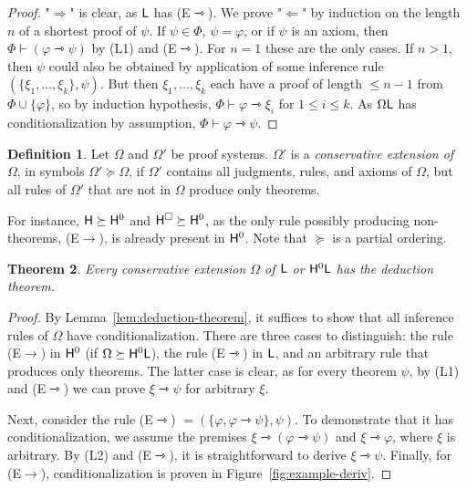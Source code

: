 \documentclass[a4paper,english,fleqn,11pt,final]{scrartcl}
\newcommand{\sfH}{\protect\ensuremath{\mathsf{H}}}
\newcommand{\sfL}{\protect\ensuremath{\mathsf{L}}}
\newcommand{\imp}{\rightarrow}
\newcommand{\timp}{\rightarrowtriangle}
\newcommand{\Deriv}[1]{{\normalfont\textsf{#1}}}
\theoremstyle{plain}
\newtheorem{theorem}{Theorem}[section]
\theoremstyle{definition}
\newtheorem{definition}[theorem]{Definition}
\begin{document}
\begin{proof}
"$\Rightarrow$" is clear, as $\sfL$ has \Deriv{(E$\timp$)}.
We prove "$\Leftarrow$" by induction on the length $n$ of a shortest proof of $\psi$.
If $\psi \in \Phi$, $\psi = \varphi$, or if $\psi$ is an axiom, then $\Phi \vdash (\varphi \timp \psi)$ by \Deriv{(L1)} and \Deriv{(E$\timp$)}.
For $n = 1$ these are the only cases.
If $n > 1$, then $\psi$ could also be obtained by application of some inference rule $(\{\xi_1, \ldots, \xi_k\},\psi)$.
But then $\xi_1, \ldots, \xi_k$ each have a proof of length $\leq n-1$ from $\Phi \cup \{\varphi\}$, so by induction hypothesis, $\Phi \vdash \varphi \timp \xi_i$ for $1 \leq i \leq k$.
As $\Omega\sfL$ has conditionalization by assumption, $\Phi \vdash \varphi \timp \psi$.
\end{proof}


\begin{definition}
Let $\Omega$ and $\Omega'$ be proof systems.
$\Omega'$ is a \emph{conservative extension of} $\Omega$, in symbols $\Omega' \succeq \Omega$, if $\Omega'$ contains all judgments, rules, and axioms of $\Omega$, but all rules of $\Omega'$ that are not in $\Omega$ produce only theorems.
\end{definition}

For instance, $\sfH \succeq \sfH^0$ and $\sfH^\Box \succeq \sfH^0$, as the only rule possibly producing non-theorems, \Deriv{(E$\imp$)}, is already present in $\sfH^0$.
Note that $\succeq$ is a partial ordering.



\begin{theorem}\label{thm:ext-deduction}
Every conservative extension $\Omega$ of $\sfL$ or $\sfH^0\sfL$ has the deduction theorem.
\end{theorem}
\begin{proof}
By Lemma~\ref{lem:deduction-theorem}, it suffices to show that all inference rules of $\Omega$ have conditionalization.
There are three cases to distinguish:
the rule \Deriv{(E$\imp$)} in $\sfH^0$ (if $\Omega\succeq \sfH^0\sfL$), the rule \Deriv{(E$\timp$)} in $\sfL$, and an arbitrary rule that produces only theorems.
The latter case is clear, as for every theorem $\psi$, by \Deriv{(L1)} and \Deriv{(E$\timp$)} we can prove $\xi \timp \psi$ for arbitrary $\xi$.

Next, consider the rule \Deriv{(E$\timp$)} $= (\{\varphi, \varphi \timp \psi\}, \psi)$.
To demonstrate that it has conditionalization, we assume the premises $\xi \timp (\varphi \timp \psi)$ and $\xi \timp \varphi$, where $\xi$ is arbitrary.
By \Deriv{(L2)} and \Deriv{(E$\timp$)}, it is straightforward to derive $\xi \timp \psi$.
Finally, for \Deriv{(E$\imp$)}, conditionalization is proven in Figure~\ref{fig:example-deriv}.
\end{proof}
\end{document}
